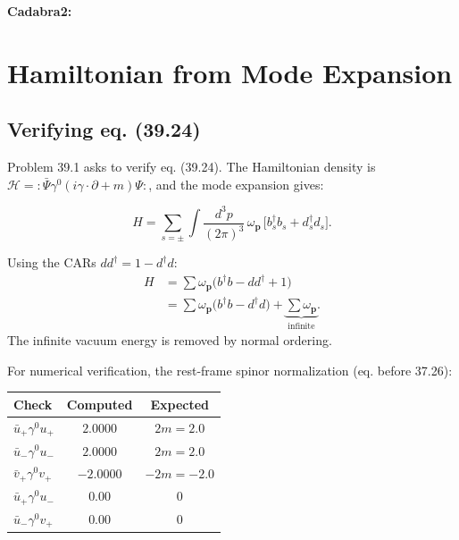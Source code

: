 \textbf{Cadabra2:}


\section{Hamiltonian from Mode Expansion}

\subsection{Verifying eq. (39.24)}

Problem 39.1 asks to verify eq. (39.24).
The Hamiltonian density is
$\mathcal{H} = :\bar\Psi\gamma^0(i\gamma\cdot\partial+m)\Psi:$,
and the mode expansion gives:
\begin{mdframed}[backgroundcolor=blue!5]
\begin{equation}
H = \sum_{s=\pm}\int\frac{d^3p}{(2\pi)^3}\,
\omega_{\mathbf{p}}\,
\bigl[ b_s^\dagger b_s + d_s^\dagger d_s \bigr] .
\tag{39.24}
\end{equation}
\end{mdframed}

Using the CARs $dd^\dagger = 1-d^\dagger d$:
\begin{align}
H &= \sum\omega_{\mathbf{p}}\bigl(b^\dagger b - dd^\dagger + 1\bigr) \\
  &= \sum\omega_{\mathbf{p}}\bigl(b^\dagger b - d^\dagger d\bigr) + \underbrace{\sum\omega_{\mathbf{p}}}_{\text{infinite}} .
\end{align}
The infinite vacuum energy is removed by normal ordering.

\begin{mdframed}[backgroundcolor=green!5]
\end{mdframed}

For numerical verification, the rest-frame spinor normalization (eq. before 37.26):
\begin{center}
\begin{tabular}{l|c|c}
Check & Computed & Expected \\ \hline
$\bar u_+\gamma^0 u_+$ & $2.0000$ & $2m=2.0$ \\
$\bar u_-\gamma^0 u_-$ & $2.0000$ & $2m=2.0$ \\
$\bar v_+\gamma^0 v_+$ & $-2.0000$ & $-2m=-2.0$ \\
$\bar u_+\gamma^0 u_-$ & $0.00$ & $0$ \\
$\bar u_-\gamma^0 v_+$ & $0.00$ & $0$ \\
\end{tabular}
\end{center}

